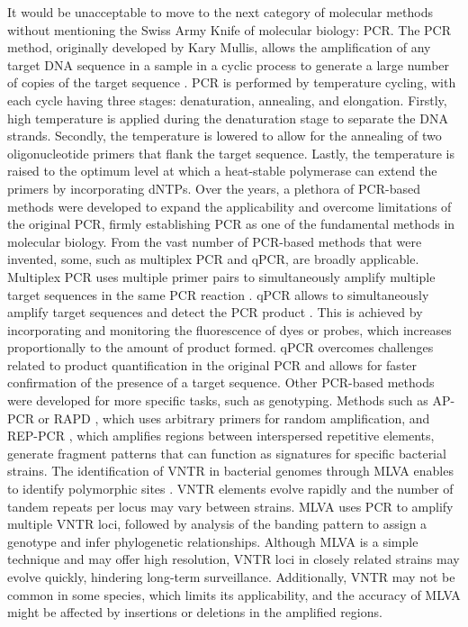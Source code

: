 It would be unacceptable to move to the next category of molecular methods without mentioning the Swiss Army Knife of molecular biology: \ac{PCR}. The \ac{PCR} method, originally developed by Kary Mullis, allows the amplification of any target \ac{DNA} sequence in a sample in a cyclic process to generate a large number of copies of the target sequence \cite{mullis_specific_1986}. \ac{PCR} is performed by temperature cycling, with each cycle having three stages: denaturation, annealing, and elongation. Firstly, high temperature is applied during the denaturation stage to separate the \ac{DNA} strands. Secondly, the temperature is lowered to allow for the annealing of two oligonucleotide primers that flank the target sequence. Lastly, the temperature is raised to the optimum level at which a heat-stable polymerase can extend the primers by incorporating \ac{dNTPs}. Over the years, a plethora of \ac{PCR}-based methods were developed to expand the applicability and overcome limitations of the original \ac{PCR}, firmly establishing \ac{PCR} as one of the fundamental methods in molecular biology.
From the vast number of \ac{PCR}-based methods that were invented, some, such as multiplex \ac{PCR} and \ac{qPCR}, are broadly applicable. Multiplex \ac{PCR} uses multiple primer pairs to simultaneously amplify multiple target sequences in the same \ac{PCR} reaction \cite{chamberlain_deletion_1988}. \ac{qPCR} allows to simultaneously amplify target sequences and detect the \ac{PCR} product \cite{higuchi_simultaneous_1992, kubista_real-time_2006}. This is achieved by incorporating and monitoring the fluorescence of dyes or probes, which increases proportionally to the amount of product formed. \ac{qPCR} overcomes challenges related to product quantification in the original \ac{PCR} and allows for faster confirmation of the presence of a target sequence.
Other \ac{PCR}-based methods were developed for more specific tasks, such as genotyping. Methods such as \ac{AP-PCR or RAPD} \cite{welsh_fingerprinting_1990, williams_dna_1990}, which uses arbitrary primers for random amplification, and \ac{REP-PCR} \cite{versalovic_distribution_1991, de_bruijn_use_1992}, which amplifies regions between interspersed repetitive elements, generate fragment patterns that can function as signatures for specific bacterial strains. The identification of \ac{VNTR} in bacterial genomes through \ac{MLVA} enables to identify polymorphic sites \cite{lindstedt_multiple-locus_2005}. \ac{VNTR} elements evolve rapidly and the number of tandem repeats per locus may vary between strains. \ac{MLVA} uses \ac{PCR} to amplify multiple \ac{VNTR} loci, followed by analysis of the banding pattern to assign a genotype and infer phylogenetic relationships. Although \ac{MLVA} is a simple technique and may offer high resolution, \ac{VNTR} loci in closely related strains may evolve quickly, hindering long-term surveillance. Additionally, \ac{VNTR} may not be common in some species, which limits its applicability, and the accuracy of \ac{MLVA} might be affected by insertions or deletions in the amplified regions.
